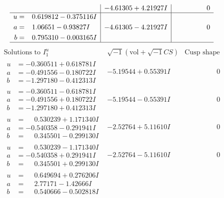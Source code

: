 \documentclass[1p]{elsarticle_modified}
\theoremstyle{definition}
\newcommand{\I}{\sqrt{-1}}
\begin{document}
$$\begin{array}{c|c|c}
 & -4.61305 + 4.21927 I & \phantom{-0.000000 } 0 \\ \hline\begin{aligned}
u &= \phantom{-}0.619812 - 0.375116 I \\
a &= \phantom{-}1.06651 - 0.93827 I \\
b &= \phantom{-}0.795310 - 0.003165 I\end{aligned}
 & -4.61305 - 4.21927 I & \phantom{-0.000000 } 0\\
 \hline 
 \end{array}$$\newpage$$\begin{array}{c|c|c}  
\text{Solutions to }I^u_{1}& \I (\text{vol} + \sqrt{-1}CS) & \text{Cusp shape}\\
 \hline 
\begin{aligned}
u &= -0.360511 + 0.618781 I \\
a &= -0.491556 - 0.180722 I \\
b &= -1.297180 - 0.412313 I\end{aligned}
 & -5.19544 + 0.55391 I & \phantom{-0.000000 } 0 \\ \hline\begin{aligned}
u &= -0.360511 - 0.618781 I \\
a &= -0.491556 + 0.180722 I \\
b &= -1.297180 + 0.412313 I\end{aligned}
 & -5.19544 - 0.55391 I & \phantom{-0.000000 } 0 \\ \hline\begin{aligned}
u &= \phantom{-}0.530239 + 1.171340 I \\
a &= -0.540358 - 0.291941 I \\
b &= \phantom{-}0.345501 - 0.299130 I\end{aligned}
 & -2.52764 + 5.11610 I & \phantom{-0.000000 } 0 \\ \hline\begin{aligned}
u &= \phantom{-}0.530239 - 1.171340 I \\
a &= -0.540358 + 0.291941 I \\
b &= \phantom{-}0.345501 + 0.299130 I\end{aligned}
 & -2.52764 - 5.11610 I & \phantom{-0.000000 } 0 \\ \hline\begin{aligned}
u &= \phantom{-}0.649694 + 0.276206 I \\
a &= \phantom{-}2.77171 - 1.42666 I \\
b &= \phantom{-}0.540666 - 0.502818 I\end{aligned}

\end{array}$$
\end{document}

